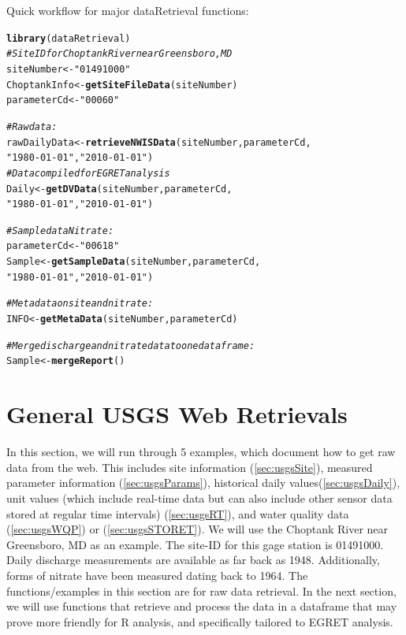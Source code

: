 \documentclass[a4paper,11pt]{article}\usepackage[]{graphicx}\usepackage[]{color}
\makeatletter
\newcommand{\hlstr}[1]{\textcolor[rgb]{0.192,0.494,0.8}{#1}}%
\newcommand{\hlcom}[1]{\textcolor[rgb]{0.678,0.584,0.686}{\textit{#1}}}%
\newcommand{\hlstd}[1]{\textcolor[rgb]{0.345,0.345,0.345}{#1}}%
\newcommand{\hlkwb}[1]{\textcolor[rgb]{0.69,0.353,0.396}{#1}}%
\newcommand{\hlkwd}[1]{\textcolor[rgb]{0.737,0.353,0.396}{\textbf{#1}}}%
\newenvironment{kframe}{%
 \def\at@end@of@kframe{}%
 \ifinner\ifhmode%
  \def\at@end@of@kframe{\end{minipage}}%
  \begin{minipage}{\columnwidth}%
 \fi\fi%
 \def\FrameCommand##1{\hskip\@totalleftmargin \hskip-\fboxsep
 \colorbox{shadecolor}{##1}\hskip-\fboxsep
     \hskip-\linewidth \hskip-\@totalleftmargin \hskip\columnwidth}%
 \MakeFramed {\advance\hsize-\width
   \@totalleftmargin\z@ \linewidth\hsize
   \@setminipage}}%
 {\par\unskip\endMakeFramed%
 \at@end@of@kframe}
\newenvironment{knitrout}{}{} %
\makeatother
\begin{document}
Quick workflow for major dataRetrieval functions:
\begin{knitrout}
\color{fgcolor}\begin{kframe}
\begin{alltt}
\hlkwd{library}\hlstd{(dataRetrieval)}
\hlcom{# Site ID for Choptank River near Greensboro, MD}
\hlstd{siteNumber} \hlkwb{<-} \hlstr{"01491000"}
\hlstd{ChoptankInfo} \hlkwb{<-} \hlkwd{getSiteFileData}\hlstd{(siteNumber)}
\hlstd{parameterCd} \hlkwb{<-} \hlstr{"00060"}

\hlcom{#Raw data:}
\hlstd{rawDailyData} \hlkwb{<-} \hlkwd{retrieveNWISData}\hlstd{(siteNumber,parameterCd,}
                      \hlstr{"1980-01-01"}\hlstd{,}\hlstr{"2010-01-01"}\hlstd{)}
\hlcom{# Data compiled for EGRET analysis}
\hlstd{Daily} \hlkwb{<-} \hlkwd{getDVData}\hlstd{(siteNumber,parameterCd,}
                      \hlstr{"1980-01-01"}\hlstd{,}\hlstr{"2010-01-01"}\hlstd{)}

\hlcom{# Sample data Nitrate:}
\hlstd{parameterCd} \hlkwb{<-} \hlstr{"00618"}
\hlstd{Sample} \hlkwb{<-} \hlkwd{getSampleData}\hlstd{(siteNumber,parameterCd,}
                      \hlstr{"1980-01-01"}\hlstd{,}\hlstr{"2010-01-01"}\hlstd{)}

\hlcom{# Metadata on site and nitrate:}
\hlstd{INFO} \hlkwb{<-} \hlkwd{getMetaData}\hlstd{(siteNumber,parameterCd)}

\hlcom{# Merge discharge and nitrate data to one dataframe:}
\hlstd{Sample} \hlkwb{<-} \hlkwd{mergeReport}\hlstd{()}
\end{alltt}
\end{kframe}
\end{knitrout}



\section{General USGS Web Retrievals}
In this section, we will run through 5 examples, which document how to get raw data from the web. This includes site information (\ref{sec:usgsSite}), measured parameter information (\ref{sec:usgsParams}), historical daily values(\ref{sec:usgsDaily}), unit values (which include real-time data but can also include other sensor data stored at regular time intervals) (\ref{sec:usgsRT}), and water quality data (\ref{sec:usgsWQP}) or (\ref{sec:usgsSTORET}). We will use the Choptank River near Greensboro, MD as an example.  The site-ID for this gage station is 01491000. Daily discharge measurements are available as far back as 1948.  Additionally, forms of nitrate have been measured dating back to 1964. The functions/examples in this section are for raw data retrieval.  In the next section, we will use functions that retrieve and process the data in a dataframe that may prove more friendly for R analysis, and specifically tailored to EGRET analysis.
\end{document}
